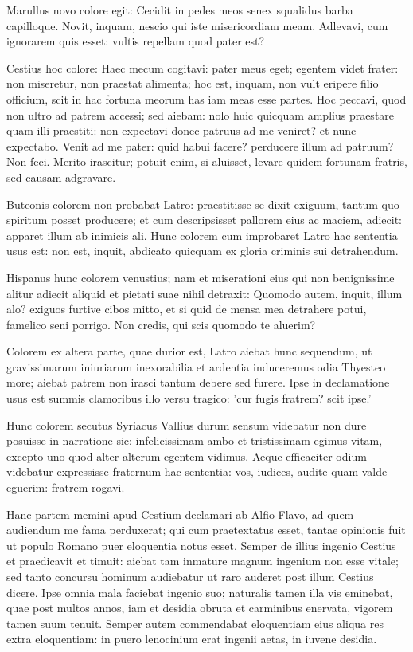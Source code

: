 Marullus novo colore egit: Cecidit in pedes meos senex squalidus barba capilloque. Novit, inquam, nescio qui iste misericordiam meam. Adlevavi, cum ignorarem quis esset: vultis repellam quod pater est?

Cestius hoc colore: Haec mecum cogitavi: pater meus eget; egentem videt frater: non miseretur, non praestat alimenta; hoc est, inquam, non vult eripere filio officium, scit in hac fortuna meorum has iam meas esse partes. Hoc peccavi, quod non ultro ad patrem accessi; sed aiebam: nolo huic quicquam amplius praestare quam illi praestiti: non expectavi donec patruus ad me veniret? et nunc expectabo. Venit ad me pater: quid habui facere? perducere illum ad patruum? Non feci. Merito irascitur; potuit enim, si aluisset, levare quidem fortunam fratris, sed causam adgravare.

Buteonis colorem non probabat Latro: praestitisse se dixit exiguum, tantum quo spiritum posset producere; et cum descripsisset pallorem eius ac maciem, adiecit: apparet illum ab inimicis ali. Hunc colorem cum improbaret Latro hac sententia usus est: non est, inquit, abdicato quicquam ex gloria criminis sui detrahendum. 	

Hispanus hunc colorem venustius; nam et miserationi eius qui non benignissime alitur adiecit aliquid et pietati suae nihil detraxit: Quomodo autem, inquit, illum alo? exiguos furtive cibos mitto, et si quid de mensa mea detrahere potui, famelico seni porrigo. Non credis, qui scis quomodo te aluerim?

\bigskip

Colorem ex altera parte, quae durior est, Latro aiebat hunc sequendum, ut gravissimarum iniuriarum inexorabilia et ardentia induceremus odia Thyesteo more; aiebat patrem non irasci tantum debere sed furere. Ipse in declamatione usus est summis clamoribus illo versu tragico: 'cur fugis fratrem? scit ipse.' 	

Hunc colorem secutus Syriacus Vallius durum sensum videbatur non dure posuisse in narratione sic: infelicissimam ambo et tristissimam egimus vitam, excepto uno quod alter alterum egentem vidimus. Aeque efficaciter odium videbatur expressisse fraternum hac sententia: vos, iudices, audite quam valde eguerim: fratrem rogavi. 	

Hanc partem memini apud Cestium declamari ab Alfio Flavo, ad quem audiendum me fama perduxerat; qui cum praetextatus esset, tantae opinionis fuit ut populo Romano puer eloquentia notus esset. Semper de illius ingenio Cestius et praedicavit et timuit: aiebat tam inmature magnum ingenium non esse vitale; sed tanto concursu hominum audiebatur ut raro auderet post illum Cestius dicere. Ipse omnia mala faciebat ingenio suo; naturalis tamen illa vis eminebat, quae post multos annos, iam et desidia obruta et carminibus enervata, vigorem tamen suum tenuit. Semper autem commendabat eloquentiam eius aliqua res extra eloquentiam: in puero lenocinium erat ingenii aetas, in iuvene desidia.

